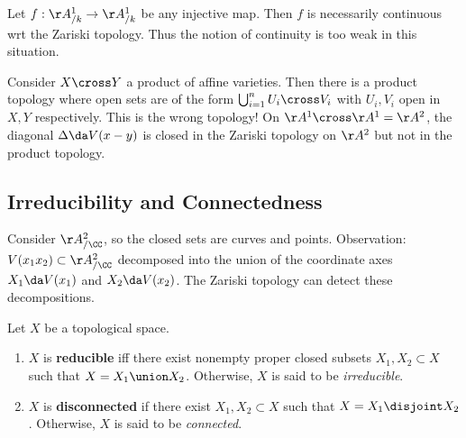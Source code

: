 \begin{example}

Let \(f: \AA^1_{/k} \to \AA^1_{/k}\) be any injective map. Then \(f\) is
necessarily continuous wrt the Zariski topology. Thus the notion of
continuity is too weak in this situation.

\end{example}

\begin{warnings}

Consider \(X\cross Y\) a product of affine varieties. Then there is a
product topology where open sets are of the form
\(\bigcup_{i=1}^n U_i \cross V_i\) with \(U_i, V_i\) open in \(X, Y\)
respectively. This is the wrong topology! On
\(\AA^1 \cross \AA^1 = \AA^2\), the diagonal \(\Delta \da V(x-y)\) is
closed in the Zariski topology on \(\AA^2\) but not in the product
topology.

\end{warnings}

\hypertarget{irreducibility-and-connectedness}{%
\subsection{Irreducibility and
Connectedness}\label{irreducibility-and-connectedness}}

\begin{example}

Consider \(\AA^2_{/\CC}\), so the closed sets are curves and points.
Observation: \(V(x_1 x_2 ) \subset \AA^2_{/\CC}\) decomposed into the
union of the coordinate axes \(X_1 \da V(x_1)\) and \(X_2 \da V(x_2)\).
The Zariski topology can detect these decompositions.

\end{example}

\begin{definition}

Let \(X\) be a topological space.

\begin{enumerate}
\def\labelenumi{\alph{enumi}.}
\item
  \(X\) is \textbf{reducible} iff there exist nonempty proper closed
  subsets \(X_1 ,X_2 \subset X\) such that \(X = X_1 \union X_2\).
  Otherwise, \(X\) is said to be \emph{irreducible}.
\item
  \(X\) is \textbf{disconnected} if there exist \(X_1, X_2 \subset X\)
  such that \(X = X_1 \disjoint X_2\). Otherwise, \(X\) is said to be
  \emph{connected}.
\end{enumerate}

\end{definition}


